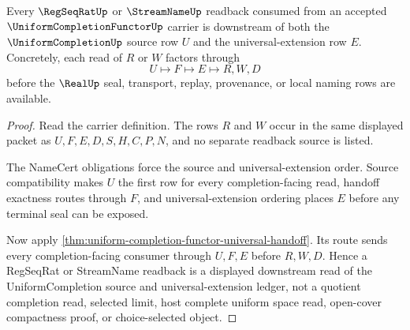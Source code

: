 \begin{theorem}
\label{thm:uniform-completion-functor-source-extension-readback}
Every $\RegSeqRatUp$ or $\StreamNameUp$ readback consumed from an accepted $\UniformCompletionFunctorUp$ carrier is downstream of both the $\UniformCompletionUp$ source row $U$ and the universal-extension row $E$. Concretely, each read of $R$ or $W$ factors through
$$
U \longmapsto F \longmapsto E \longmapsto R,W,D
$$
before the $\RealUp$ seal, transport, replay, provenance, or local naming rows are available.
\end{theorem}
\begin{proof}
Read the carrier definition. The rows $R$ and $W$ occur in the same displayed packet as $U,F,E,D,S,H,C,P,N$, and no separate readback source is listed.

The NameCert obligations force the source and universal-extension order. Source compatibility makes $U$ the first row for every completion-facing read, handoff exactness routes through $F$, and universal-extension ordering places $E$ before any terminal seal can be exposed.

Now apply \autoref{thm:uniform-completion-functor-universal-handoff}. Its route sends every completion-facing consumer through $U,F,E$ before $R,W,D$. Hence a RegSeqRat or StreamName readback is a displayed downstream read of the UniformCompletion source and universal-extension ledger, not a quotient completion read, selected limit, host complete uniform space read, open-cover compactness proof, or choice-selected object.
\end{proof}

